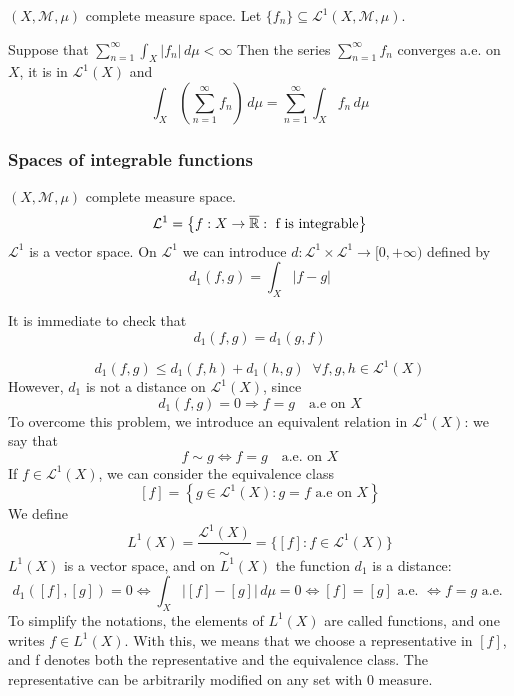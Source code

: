 \begin{proposition}
    \((X, \mathcal{M}, \mu)\) complete measure space. Let \(\{f_n\} \subseteq \mathcal{L}^1(X, \mathcal{M}, \mu)\). 
    
    Suppose that \(\sum_{n=1}^\infty \int_X |f_n| \, d\mu < \infty\)
    Then the series \(\sum_{n=1}^\infty f_n\) converges a.e. on \(X\), it is in \(\mathcal{L}^1(X)\) and 
    \[
        \int_X \left( \sum_{n=1}^\infty f_n  \right) \, d\mu = \sum_{n=1}^\infty \int_X f_n \, d\mu
    \]
\end{proposition}


\subsubsection*{Spaces of integrable functions}
\((X, \mathcal{M}, \mu)\) complete measure space.
\[
    \mathcal{L}^1 = \left\lbrace f: X \to \overline{\mathbb{R}} : \mbox{ f is integrable}\right\rbrace
\]
\(\mathcal{L}^1\) is a vector space. On \(\mathcal{L}^1\) we can introduce \(d : \mathcal{L}^1 \times \mathcal{L}^1 \to [0, +\infty)\) defined by 
\[
    d_1 (f,g) =\int_{X} \vert f-g \vert 
\]

It is immediate to check that 
\[
    d_1 (f, g) = d_1(g, f) \tag*{(symmetry)}
\]  

\[
    d_1(f, g) \leq d_1(f, h) + d_1(h, g) \; \;\forall f, g, h \in \mathcal{L}^1(X) \tag*{(triangular inequality)}
\]  
However, \(d_1\) is not a distance on \(\mathcal{L}^1(X)\), since 
\[
    d_1(f,g) = 0 \Longrightarrow f=g \quad \mbox{a.e on }X
\tag*{(pseudo-distance)}\]
To overcome this problem, we introduce an equivalent relation in \(\mathcal{L}^1(X)\): we say that 
\[
    f \sim g \Longleftrightarrow f = g \quad \mbox{a.e. on }X
\]
If \(f \in \mathcal{L}^1(X)\), we can consider the equivalence class
\[
    [f] = \left\lbrace g \in \mathcal{L}^1(X) : g = f \mbox{ a.e on }X \right\rbrace
\]
We define
\[
    L^1(X) = \frac{\mathcal{L}^1(X)}{\sim} = \{[f]: f \in \mathcal{L}^1(X)\}
\]
\(L^1(X)\) is a vector space, and on \(L^1(X)\) the function \(d_1\) is a distance: 
\[
    d_1([f], [g]) = 0 \iff \int_X |[f]-[g]|\, d\mu =0 \iff [f]= [g] \text{ a.e. } \iff f=g \text{ a.e. }
\]
To simplify the notations, the elements of \(L^1(X)\) are called functions, and one writes \(f \in L^1(X)\). With this, we means that we choose a representative in \([f]\), and f denotes both the representative and the equivalence class. The representative can be arbitrarily modified on any set with \(0\) measure.

